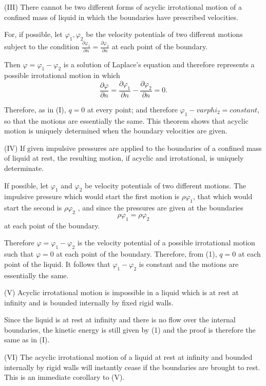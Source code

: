 \documentclass[a4paper]{article}
\begin{document}
(III) There cannot be two different forms of acyclic irrotational motion of a confined mass of liquid in which the boundaries
have prescribed velocities.

For, if possible, let $\varphi_1, \varphi_2$ be the velocity potentials of two different motions subject to the condition
$\frac{\partial \varphi_1}{\partial n} = \frac{\partial \varphi_2}{\partial n}$ at each point of the boundary.

Then $\varphi = \varphi_1-\varphi_2$ is a solution of Laplace's equation and therefore represents a possible irrotational
motion in which
$$\frac{\partial \varphi}{\partial n}=\frac{\partial \varphi_1}{\partial n} - \frac{\partial \varphi_2}{\partial n} = 0.$$

Therefore, as in (I), $q = 0$ at every point; and therefore $\varphi_1 - varphi_2 = constant$, so that the motions are
essentially the same. This theorem shows that acyclic motion is uniquely determined when the boundary velocities are given.

(IV) If given impulsive pressures are applied to the boundaries of a confined mass of liquid at rest, the resulting motion,
if acyclic and irrotational, is uniquely determinate.

If possible, let $\varphi_1$ and $\varphi_2$ be velocity potentials of two different motions. The impulsive pressure which
would start the first motion is $\rho\varphi_1$, that which would start the second is $\rho\varphi_2$ , and since the
pressures are given at the boundaries
$$\rho\varphi_1=\rho\varphi_2$$
at each point of the boundary.

Therefore $\varphi=\varphi_1-\varphi_2$ is the velocity potential of a possible irrotational motion such that $\varphi = 0$ at
each point of the boundary. Therefore, from (1), $q = 0$ at each point of the liquid. It follows that $\varphi_1-\varphi_2$ is
constant and the motions are essentially the same.

(V) Acyclic irrotational motion is impossible in a liquid which is at rest at infinity and is bounded internally by fixed
rigid walls.

Since the liquid is at rest at infinity and there is no flow over the internal boundaries, the kinetic energy is still
given by (1) and the proof is therefore the same as in (I).

(VI) The acyclic irrotational motion of a liquid at rest at infinity and bounded internally by rigid walls will instantly
cease if the boundaries are brought to rest. This is an immediate corollary to (V).
\end{document}
